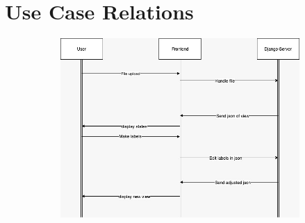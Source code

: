 \documentclass[12pt]{extarticle}
\begin{document}
\section{Use Case Relations}

\begin{figure}[H]
    \centering
    \begin{subfigure}[b]{0.85\textwidth}
        \includegraphics[width=\textwidth]{img1.jpeg}
        \label{fig:arc_1}
    \end{subfigure}
\end{figure}
\end{document}
